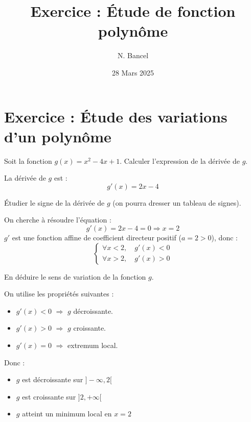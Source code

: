 \documentclass{exam}
\title{Exercice : Étude de fonction polynôme}
\author{N. Bancel}
\date{28 Mars 2025}
\begin{document}
\maketitle

\section*{Exercice : Étude des variations d’un polynôme }

\begin{questions}

\question Soit la fonction $g(x) = x^2 - 4x + 1$. Calculer l’expression de la dérivée de $g$.
\begin{solution}
La dérivée de $g$ est :
\[
g'(x) = 2x - 4
\]
\end{solution}

\question Étudier le signe de la dérivée de $g$ (on pourra dresser un tableau de signes).
\begin{solution}
On cherche à résoudre l’équation :
\[
g'(x) = 2x - 4 = 0 \Rightarrow x = 2
\]
$g'$ est une fonction affine de coefficient directeur positif ($a = 2 > 0$), donc :
\[
\begin{cases}
\forall x < 2, \quad g'(x) < 0 \\
\forall x > 2, \quad g'(x) > 0
\end{cases}
\]

\begin{center}
\end{center}
\end{solution}

\question En déduire le sens de variation de la fonction $g$.
\begin{solution}
On utilise les propriétés suivantes :
\begin{itemize}
\item $g'(x) < 0$ $\Rightarrow$ $g$ décroissante.
\item $g'(x) > 0$ $\Rightarrow$ $g$ croissante.
\item $g'(x) = 0$ $\Rightarrow$ extremum local.
\end{itemize}

Donc :
\begin{itemize}
\item $g$ est décroissante sur $]-\infty, 2[$
\item $g$ est croissante sur $]2, +\infty[$
\item $g$ atteint un minimum local en $x = 2$
\end{itemize}


\end{solution}
\end{questions}
\end{document}
